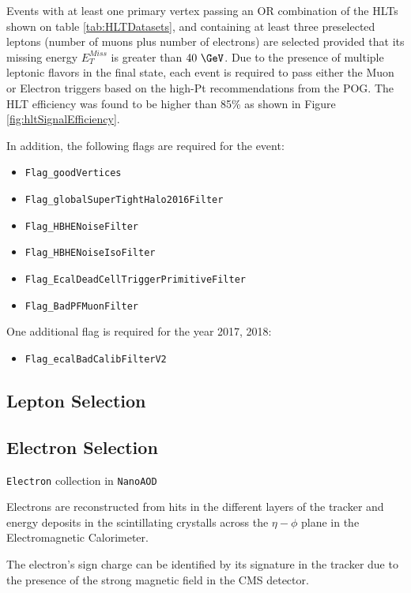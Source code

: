 Events with at least one primary vertex passing an OR combination
of the HLTs shown on table \ref{tab:HLTDatasets}, and containing at least three
preselected leptons (number of muons plus number of electrons) are selected
provided that its missing energy $E_T^{Miss}$ is greater than $40~\GeV$.
Due to the presence of multiple leptonic flavors in the final state, each event
is required to pass either the Muon or Electron triggers based on the high-Pt
recommendations from the POG. The HLT efficiency was found to be higher
than 85\% as shown in Figure \ref{fig:hltSignalEfficiency}.

In addition, the following flags are required for the event:

\begin{itemize}
  \item \verb|Flag_goodVertices|
  \item \verb|Flag_globalSuperTightHalo2016Filter|
  \item \verb|Flag_HBHENoiseFilter|
  \item \verb|Flag_HBHENoiseIsoFilter|
  \item \verb|Flag_EcalDeadCellTriggerPrimitiveFilter|
  \item \verb|Flag_BadPFMuonFilter|
\end{itemize}

One additional flag is required for the year 2017, 2018:

\begin{itemize}
\item \verb|Flag_ecalBadCalibFilterV2|
\end{itemize}

\subsection{Lepton Selection}

\subsection{Electron Selection}

\verb|Electron| collection in \verb|NanoAOD|

Electrons are reconstructed from hits in the different
layers of the tracker and energy deposits in the scintillating crystalls
across the $\eta-\phi$ plane in the Electromagnetic Calorimeter.

The electron's sign charge can be identified by its signature in the tracker
due to the presence of the strong magnetic field in the CMS detector.

